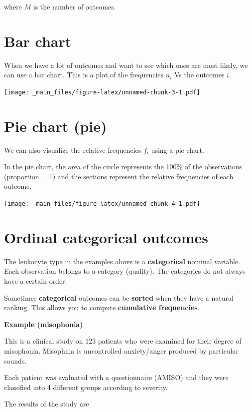 \documentclass[
]{book}
\begin{document}
where \(M\) is the number of outcomes.

\hypertarget{bar-chart}{%
\section{Bar chart}\label{bar-chart}}

When we have a lot of outcomes and want to see which ones are most likely, we can use a bar chart. This is a plot of the frequencies \(n_i\) Vs the outcomes \(i\).

\texttt{[image: \_main\_files/figure-latex/unnamed-chunk-3-1.pdf]}

\hypertarget{pie-chart-pie}{%
\section{Pie chart (pie)}\label{pie-chart-pie}}

We can also visualize the relative frequencies \(f_i\) using a pie chart.

In the pie chart, the area of the circle represents the 100\% of the observations (proportion = 1) and the sections represent the relative frequencies of each outcome.

\texttt{[image: \_main\_files/figure-latex/unnamed-chunk-4-1.pdf]}

\hypertarget{ordinal-categorical-outcomes}{%
\section{Ordinal categorical outcomes}\label{ordinal-categorical-outcomes}}

The leukocyte type in the examples above is a \textbf{categorical} nominal variable. Each observation belongs to a category (quality). The categories do not always have a certain order.

Sometimes \textbf{categorical} outcomes can be \textbf{sorted} when they have a natural ranking. This allows you to compute \textbf{cumulative frequencies}.

\textbf{Example (misophonia)}

This is a clinical study on \(123\) patients who were examined for their degree of misophonia. Misophnia is uncontrolled anxiety/anger produced by particular sounds.

Each patient was evaluated with a questionnaire (AMISO) and they were classified into 4 different groups according to severity.

The results of the study are
\end{document}
